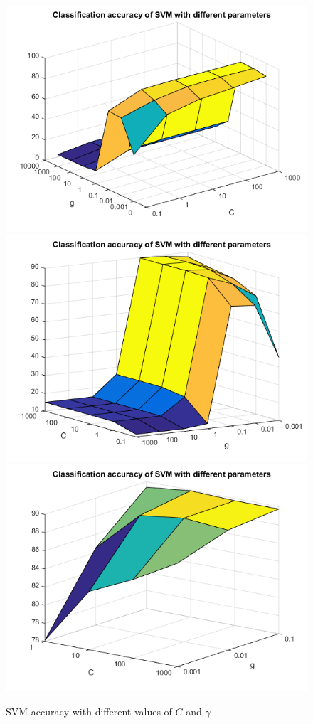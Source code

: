 \documentclass{article} %
\begin{document}
\begin{figure}[h]
\begin{center}
\includegraphics[scale=0.45]{svmview1.png}
\includegraphics[scale=0.45]{svmview2.png}
\includegraphics[scale=0.45]{svmview3.png}
\end{center}
\caption{SVM accuracy with different values of $C$ and $\gamma$}
\end{figure}
\end{document}
